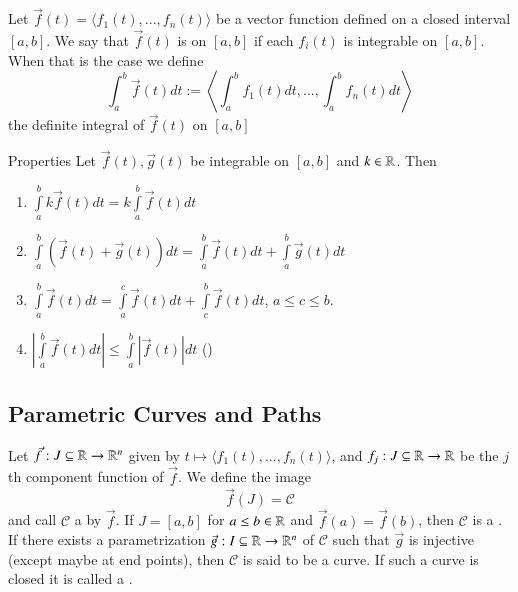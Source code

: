 \documentclass[12pt]{report}
\begin{document}
\begin{appendices}
    \begin{defn}{}{}
        Let $\vec{f}(t) = \langle f_1(t),...,f_n(t)\rangle$ be a vector function defined on a closed interval $[a,b]$. We say that $\vec{f}(t)$ is  on $[a,b]$ if each $f_i(t)$ is integrable on $[a,b]$. When that is the case we define \begin{equation}
            \int_a^b\vec{f}(t)dt := \left\langle \int_a^bf_1(t)dt,...,\int_a^bf_n(t)dt\right\rangle
        \end{equation}
        the definite integral of $\vec{f}(t)$ on $[a,b]$
    \end{defn}


    \begin{rmk}{Properties}{}
        Let $\vec{f}(t),\vec{g}(t)$ be integrable on $[a,b]$ and $k \in \mathbb R$. Then \begin{enumerate}
            \item $\int\limits_a^bk\vec{f}(t)dt = k\int\limits_a^b\vec{f}(t)dt$
            \item $\int\limits_a^b(\vec{f}(t)+\vec{g}(t))dt = \int\limits_a^b\vec{f}(t)dt + \int\limits_a^b\vec{g}(t)dt$
            \item $\int\limits_a^b\vec{f}(t)dt = \int\limits_a^c\vec{f}(t)dt + \int\limits_c^b\vec{f}(t)dt$, $a \leq c \leq b$.
            \item $\left|\int\limits_a^b\vec{f}(t)dt\right| \leq \int\limits_a^b\left|\vec{f}(t)\right|dt$ ()
        \end{enumerate}
    \end{rmk}


    \subsection{Parametric Curves and Paths}

    \begin{defn}{}{}
        Let $\vec{f}:J\subseteq \mathbb R\rightarrow \mathbb R^n$ given by $t \mapsto \langle f_1(t),..., f_n(t)\rangle$, and $f_j: J\subseteq \mathbb R\rightarrow \mathbb R$ be the $j$th component function of $\vec{f}$. We define the image \begin{equation}
            \vec{f}(J) = \mathscr{C}
        \end{equation}
        and call $\mathscr{C}$ a  by $\vec{f}$. If $J = [a,b]$ for $a \leq b \in \mathbb R$ and $\vec{f}(a) = \vec{f}(b)$, then $\mathscr{C}$ is a . If there exists a parametrization $\vec{g}:I \subseteq \mathbb R \rightarrow \mathbb R^n$ of $\mathscr{C}$ such that $\vec{g}$ is injective (except maybe at end points), then $\mathscr{C}$ is said to be a  curve. If such a curve is closed it is called a .
    \end{defn}


\end{appendices}
\end{document}
